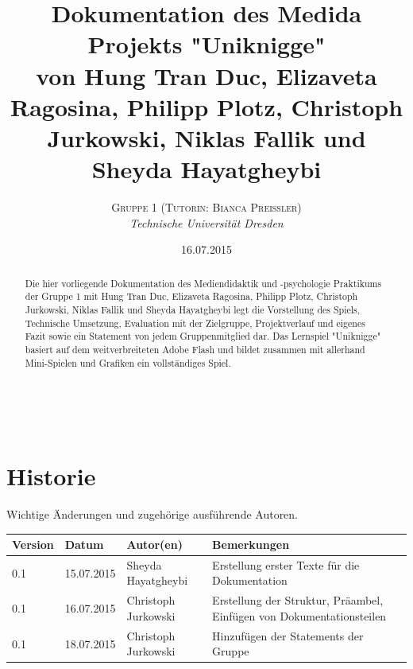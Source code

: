\documentclass[a4paper, 11pt]{article} %
\title{\textbf{Dokumentation des Medida Projekts "Uniknigge"}\\ %
von Hung Tran Duc, Elizaveta Ragosina, Philipp Plotz, Christoph Jurkowski, Niklas Fallik und Sheyda Hayatgheybi} %
\author{\textsc{Gruppe 1 (Tutorin: Bianca Preißler)} %
\\{\textit{Technische Universität Dresden}}} %
\date{16.07.2015} %
\makeatletter
\renewcommand{\maketitle}{ %
\begin{flushright} %
{\LARGE\@title} %

\vspace{50pt} %

{\large\@author} %
\\\@date %

\vspace{40pt} %
\end{flushright}
}
\makeatother
\begin{document}
\maketitle %


\renewcommand{\abstractname}{Präambel} %

\vspace{5cm} %


\begin{abstract}
\noindent
Die hier vorliegende Dokumentation des Mediendidaktik und -psychologie Praktikums der Gruppe 1 mit Hung Tran Duc, Elizaveta Ragosina, Philipp Plotz, Christoph Jurkowski, Niklas Fallik und Sheyda Hayatgheybi legt die Vorstellung des Spiels, Technische Umsetzung, Evaluation mit der Zielgruppe, Projektverlauf
und eigenes Fazit sowie ein Statement von jedem Gruppenmitglied dar. Das Lernspiel "Uniknigge" basiert auf dem weitverbreiteten Adobe Flash und bildet zusammen mit allerhand Mini-Spielen und Grafiken ein vollständiges Spiel.
\end{abstract}


\newpage 
\section*{Historie}
Wichtige Änderungen und zugehörige ausführende Autoren.\\
\begin{tabular}{|lllp{5.5cm}|}
\hline 
\textbf{Version} & \textbf{Datum} & \textbf{Autor(en)} & \textbf{Bemerkungen} \\ 
\hline 
0.1 & 15.07.2015 & Sheyda Hayatgheybi & \nohyphens{Erstellung erster Texte für die Dokumentation} \\ 
\hline
0.1 & 16.07.2015 & Christoph Jurkowski & \nohyphens{Erstellung der Struktur, Präambel, Einfügen von Dokumentationsteilen} \\ 
\hline
0.1 & 18.07.2015 & Christoph Jurkowski & \nohyphens{Hinzufügen der Statements der Gruppe} \\ 
\hline
\end{tabular} 
\end{document}
